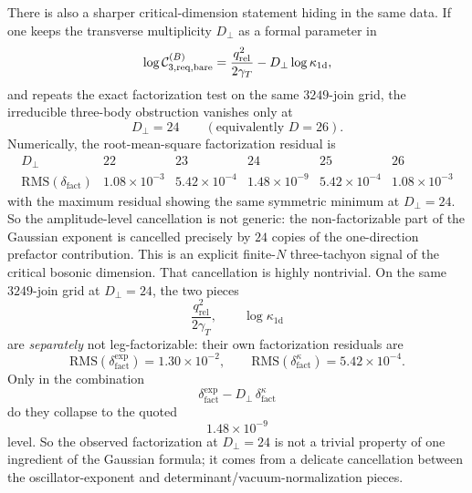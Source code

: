\documentclass[11pt]{article}
\numberwithin{equation}{section}
\newcommand{\perpD}{D_\perp}
\begin{document}
There is also a sharper critical-dimension statement hiding in the same data. If one keeps the transverse multiplicity $\perpD$ as a formal parameter in
\begin{equation}
\label{eq:s12-1-038}
\log {\cal C}^{(B)}_{3,\mathrm{req,bare}}=\frac{q_{\mathrm{rel}}^2}{2\gamma_T}-\perpD\log \kappa_{1\mathrm d},
\end{equation}
and repeats the exact factorization test on the same $3249$-join grid, the irreducible three-body obstruction vanishes only at
\begin{equation}
\label{eq:s12-1-039}
\perpD=24
\qquad
(\text{equivalently }D=26).
\end{equation}
Numerically, the root-mean-square factorization residual is
\begin{equation}
\label{eq:s12-1-040}
\begin{array}{c|ccccc}
\perpD & 22 & 23 & 24 & 25 & 26 \\
\hline
\mathrm{RMS}(\delta_{\mathrm{fact}})
& 1.08\times 10^{-3}
& 5.42\times 10^{-4}
& 1.48\times 10^{-9}
& 5.42\times 10^{-4}
& 1.08\times 10^{-3}
\end{array}
\end{equation}
with the maximum residual showing the same symmetric minimum at $\perpD=24$. So the amplitude-level cancellation is not generic: the non-factorizable part of the Gaussian exponent is cancelled precisely by $24$ copies of the one-direction prefactor contribution. This is an explicit finite-$N$ three-tachyon signal of the critical bosonic dimension.
That cancellation is highly nontrivial. On the same $3249$-join grid at $\perpD=24$, the two pieces
\begin{equation}
\label{eq:s12-1-041}
\frac{q_{\mathrm{rel}}^2}{2\gamma_T},
\qquad
\log \kappa_{1\mathrm d}
\end{equation}
are \emph{separately} not leg-factorizable: their own factorization residuals are
\begin{equation}
\label{eq:s12-1-042}
\mathrm{RMS}\!\left(\delta_{\mathrm{fact}}^{\mathrm{exp}}\right)=1.30\times 10^{-2},
\qquad
\mathrm{RMS}\!\left(\delta_{\mathrm{fact}}^{\kappa}\right)=5.42\times 10^{-4}.
\end{equation}
Only in the combination
\begin{equation}
\label{eq:s12-1-043}
\delta_{\mathrm{fact}}^{\mathrm{exp}}-\perpD\,\delta_{\mathrm{fact}}^{\kappa}
\end{equation}
do they collapse to the quoted
\begin{equation}
\label{eq:s12-1-044}
1.48\times 10^{-9}
\end{equation}
level. So the observed factorization at $\perpD=24$ is not a trivial property of one ingredient of the Gaussian formula; it comes from a delicate cancellation between the oscillator-exponent and determinant/vacuum-normalization pieces.
\end{document}
